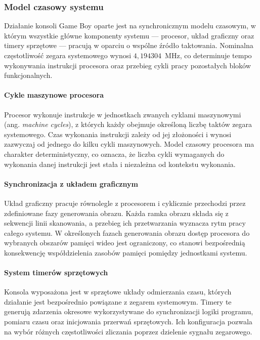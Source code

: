 \documentclass{article}
\begin{document}
\subsubsection{Model czasowy systemu}

Działanie konsoli Game Boy oparte jest na synchronicznym modelu czasowym, w którym wszystkie główne komponenty systemu --- procesor, układ graficzny oraz timery sprzętowe --- pracują w oparciu o wspólne źródło taktowania. Nominalna częstotliwość zegara systemowego wynosi $4{,}194304$~MHz, co determinuje tempo wykonywania instrukcji procesora oraz przebieg cykli pracy pozostałych bloków funkcjonalnych.

\paragraph{Cykle maszynowe procesora}

Procesor wykonuje instrukcje w jednostkach zwanych cyklami maszynowymi (ang. \emph{machine cycles}), z których każdy obejmuje określoną liczbę taktów zegara systemowego. Czas wykonania instrukcji zależy od jej złożoności i wynosi zazwyczaj od jednego do kilku cykli maszynowych. Model czasowy procesora ma charakter deterministyczny, co oznacza, że liczba cykli wymaganych do wykonania danej instrukcji jest stała i niezależna od kontekstu wykonania.

\paragraph{Synchronizacja z układem graficznym}

Układ graficzny pracuje równolegle z procesorem i cyklicznie przechodzi przez zdefiniowane fazy generowania obrazu. Każda ramka obrazu składa się z sekwencji linii skanowania, a przebieg ich przetwarzania wyznacza rytm pracy całego systemu. W określonych fazach generowania obrazu dostęp procesora do wybranych obszarów pamięci wideo jest ograniczony, co stanowi bezpośrednią konsekwencję współdzielenia zasobów pamięci pomiędzy jednostkami systemu.

\paragraph{System timerów sprzętowych}

Konsola wyposażona jest w sprzętowe układy odmierzania czasu, których działanie jest bezpośrednio powiązane z zegarem systemowym. Timery te generują zdarzenia okresowe wykorzystywane do synchronizacji logiki programu, pomiaru czasu oraz inicjowania przerwań sprzętowych. Ich konfiguracja pozwala na wybór różnych częstotliwości zliczania poprzez dzielenie sygnału zegarowego.
\end{document}
